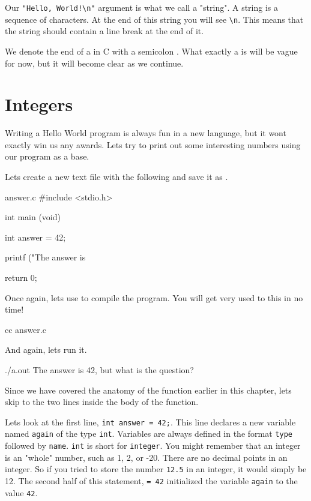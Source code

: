 Our \verb|"Hello, World!\n"| argument is what we call a "string". A string
is a sequence of characters. At the end of this string you will see \verb|\n|.
This means that the string should contain a line break at the end of it.

We denote the end of a  in C with a semicolon \ident{;}.  What
exactly a  is will be vague for now, but it will become
clear as we continue.

\section{Integers}

Writing a Hello World program is always fun in a new language, but it wont
exactly win us any awards. Lets try to print out some interesting numbers
using our program as a base.

Lets create a new text file with the following and save it as .

\begin{code}{answer.c}
#include <stdio.h>

int
main (void)
{
    int answer = 42;

    printf ("The answer is %

    return 0;
}
\end{code}

Once again, lets use  to compile the program. You will get very
used to this in no time!

\begin{Terminal}
cc answer.c
\end{Terminal}

And again, lets run it.

\begin{Terminal}
./a.out
The answer is 42, but what is the question?
\end{Terminal}

Since we have covered the anatomy of the  function earlier in this
chapter, lets skip to the two lines inside the body of the function.

Lets look at the first line, \verb|int answer = 42;|. This line declares a new
variable named \verb|again| of the type \verb|int|. Variables are always
defined in the format \verb|type| followed by \verb|name|. \verb|int| is short
for \verb|integer|.  You might remember that an integer is an "whole" number,
such as 1, 2, or -20.  There are no decimal points in an integer. So if you
tried to store the number \verb|12.5| in an integer, it would simply be 12. The
second half of this statement, \verb|= 42| initialized the variable
\verb|again| to the value \verb|42|.

